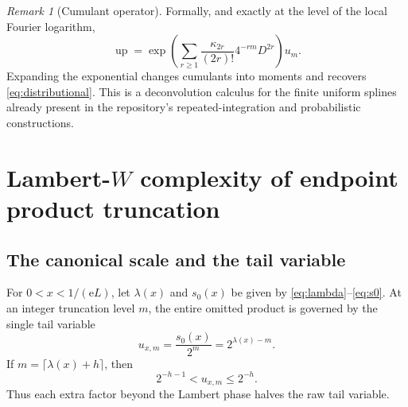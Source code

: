 \documentclass[11pt,oneside]{article}
\numberwithin{equation}{section}
\theoremstyle{definition}
\theoremstyle{remark}
\newtheorem{remark}[theorem]{Remark}
\newcommand{\Up}{\operatorname{up}}
\newcommand{\e}{\mathrm e}
\begin{document}
\begin{remark}[Cumulant operator]
Formally, and exactly at the level of the local Fourier logarithm,
\begin{equation}
 \Up=\exp\!\left(\sum_{r\ge1}
 \frac{\kappa_{2r}}{(2r)!}4^{-rm}D^{2r}\right)u_m.
 \label{eq:cumulant-operator}
\end{equation}
Expanding the exponential changes cumulants into moments and recovers
\eqref{eq:distributional}.  This is a deconvolution calculus for the finite uniform splines
already present in the repository's repeated-integration and probabilistic constructions.
\end{remark}

\section{Lambert-$W$ complexity of endpoint product truncation}
\label{sec:Lambert-complexity}

\subsection{The canonical scale and the tail variable}

For $0<x<1/(\e L)$, let $\lambda(x)$ and $s_0(x)$ be given by
\eqref{eq:lambda}--\eqref{eq:s0}.  At an integer truncation level $m$, the entire omitted
product is governed by the single tail variable
\begin{equation}
 u_{x,m}=\frac{s_0(x)}{2^m}=2^{\lambda(x)-m}.
 \label{eq:uxm}
\end{equation}
If $m=\lceil\lambda(x)+h\rceil$, then
\begin{equation}
 2^{-h-1}<u_{x,m}\le2^{-h}.
 \label{eq:u-window}
\end{equation}
Thus each extra factor beyond the Lambert phase halves the raw tail variable.
\end{document}

